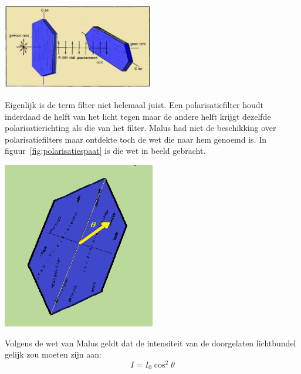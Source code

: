 \documentclass[../main.tex]{subfiles}
\begin{document}
\begin{center}
\leavevmode
\includegraphics[width=0.5\textwidth]{./img/toermalijn.png}
\end{center}

Eigenlijk is de term filter niet helemaal juist. Een polarisatiefilter houdt inderdaad de helft van het licht tegen maar de andere helft krijgt dezelfde polarisatierichting als die van het filter. 
Malus had niet de beschikking over polarisatiefilters maar ontdekte toch de wet die naar hem genoemd is. In figuur~\ref{fig:polarisatiespaat} is die wet in beeld gebracht.

\begin{center}
\leavevmode
\includegraphics[width=0.5\textwidth]{./img/malus.png}
\end{center}

Volgens de wet van Malus geldt dat de intensiteit van de doorgelaten lichtbundel gelijk zou moeten zijn aan:
$$I=I_0 \cos^2\theta$$
\end{document}

